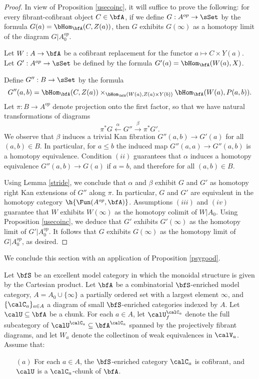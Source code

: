 \begin{Simplicial Categories}
\begin{proof}
In view of Proposition \ref{usecoinc}, it will suffice to prove the following: for every
fibrant-cofibrant object $C \in \bfA$, if we define $G: A^{op} \rightarrow \sSet$
by the formula $G(a) = \bHom_{\bfA}( C, Z(a) )$, then
$G$ exhibits $G(\infty)$ as a homotopy limit of the diagram $G|A_0^{op}$.

Let $W: A \rightarrow \bfA$ be a cofibrant replacement for the functor
$a \mapsto C \times Y(a)$. Let $G': A^{op} \rightarrow \sSet$ be defined
by the formula $G'(a) = \bHom_{\bfA}( W(a), X)$. 

Define $G'': B \rightarrow \sSet$ by the formula
$$ G''(a,b) = \bHom_{\bfA}( C, Z(a) ) \times_{ \bHom_{\bfA}( W(a), Z(a) \times Y(b) ) }
\bHom_{\bfA}( W(a), P(a,b) ).$$
Let $\pi: B \rightarrow A^{op}$ denote projection onto the first factor, so that
we have natural transformations of diagrams
$$ \pi^{\ast} G \stackrel{\alpha}{\leftarrow} G'' \stackrel{\beta}{\rightarrow} \pi^{\ast} G'.$$
We observe that $\beta$ induces a trivial Kan fibration $G''(a,b) \rightarrow G'(a)$
for all $(a,b) \in B$. In particular, for $a \leq b$ the induced map
$G''(a,a) \rightarrow G''(a,b)$ is a homotopy equivalence.
Condition $(ii)$ guarantees that $\alpha$ induces a
homotopy equivalence $G''(a,b) \rightarrow G(a)$ if $a = b$, and therefore for all
$(a,b) \in B$.

Using Lemma \ref{stride}, we conclude that $\alpha$ and $\beta$ exhibit
$G$ and $G'$ as homotopy right Kan extensions of $G''$ along $\pi$. 
In particular, $G$ and $G'$ are equivalent in the homotopy category
$\h{ \Fun( A^{op}, \bfA)}$. Assumptions $(iii)$ and
$(iv)$ guarantee that $W$ exhibits $W(\infty)$ as the homotopy colimit
of $W | A_0$. Using Proposition \ref{usecoinc}, we deduce that
$G'$ exhibits $G'(\infty)$ as the homotopy limit of $G' | A_0^{op}$. 
It follows that $G$ exhibits $G(\infty)$ as the homotopy limit of
$G| A_0^{op}$, as desired.
\end{proof}

We conclude this section with an application of Proposition \ref{psygood}. 

\begin{proposition}\label{sturb}
Let $\bfS$ be an excellent model category in which the monoidal structure
is given by the Cartesian product. Let $\bfA$ be a combinatorial $\bfS$-enriched model category,
$A = A_0 \cup \{ \infty \}$ a partially ordered set with a largest element $\infty$, and $\{ \calC_{a} \}_{a \in A}$ a diagram of small $\bfS$-enriched categories indexed by $A$. Let
$\calU \subseteq \bfA$ be a chunk. For each $a \in A$, let $\calU^{\calC_{a}}_{f}$ denote the full
subcategory of $\calU^{\calC_a} \subseteq \bfA^{\calC_a}$ spanned by the projectively fibrant diagrams,
and let $W_{a}$ denote the collectinon of weak equivalences in $\calV_{a}$.
Assume that:
\begin{itemize}
\item[$(a)$] For each $a \in A$, the $\bfS$-enriched category $\calC_{a}$ is
cofibrant, and $\calU$ is a $\calC_{a}$-chunk of $\bfA$.


\end{itemize}
\end{proposition}
\end{Simplicial Categories}
